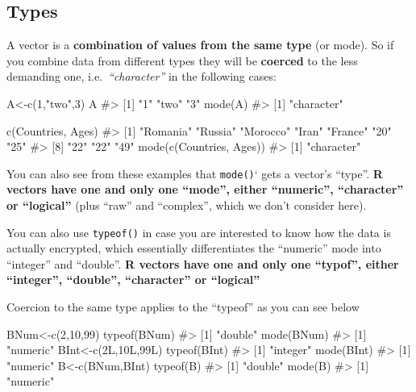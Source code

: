 \documentclass[
  letterpaper,
  DIV=11,
  numbers=noendperiod]{scrreprt}
\newenvironment{Shaded}{\begin{snugshade}}{\end{snugshade}}
\newcommand{\CommentTok}[1]{\textcolor[rgb]{0.37,0.37,0.37}{#1}}
\newcommand{\DecValTok}[1]{\textcolor[rgb]{0.68,0.00,0.00}{#1}}
\newcommand{\FunctionTok}[1]{\textcolor[rgb]{0.28,0.35,0.67}{#1}}
\newcommand{\NormalTok}[1]{\textcolor[rgb]{0.00,0.23,0.31}{#1}}
\newcommand{\OtherTok}[1]{\textcolor[rgb]{0.00,0.23,0.31}{#1}}
\newcommand{\StringTok}[1]{\textcolor[rgb]{0.13,0.47,0.30}{#1}}
\begin{document}
\subsection{Types}\label{types}

A vector is a \textbf{combination of values from the same type} (or
mode). So if you combine data from different types they will be
\textbf{coerced} to the less demanding one, i.e.~\emph{``character''} in
the following cases:

\begin{Shaded}
\begin{Highlighting}[]
\NormalTok{A}\OtherTok{\textless{}{-}}\FunctionTok{c}\NormalTok{(}\DecValTok{1}\NormalTok{,}\StringTok{"two"}\NormalTok{,}\DecValTok{3}\NormalTok{)}
\NormalTok{A}
\CommentTok{\#\textgreater{} [1] "1"   "two" "3"}
\FunctionTok{mode}\NormalTok{(A)}
\CommentTok{\#\textgreater{} [1] "character"}

\FunctionTok{c}\NormalTok{(Countries, Ages)}
\CommentTok{\#\textgreater{}  [1] "Romania" "Russia"  "Morocco" "Iran"    "France"  "20"      "25"     }
\CommentTok{\#\textgreater{}  [8] "22"      "22"      "49"}
\FunctionTok{mode}\NormalTok{(}\FunctionTok{c}\NormalTok{(Countries, Ages))}
\CommentTok{\#\textgreater{} [1] "character"}
\end{Highlighting}
\end{Shaded}

You can also see from these examples that \texttt{mode()}` gets a
vector's ``type''. \textbf{R vectors have one and only one ``mode'',
either ``numeric'', ``character'' or ``logical''} (plus ``raw'' and
``complex'', which we don't consider here).

You can also use \texttt{typeof()} in case you are interested to know
how the data is actually encrypted, which essentially differentiates the
``numeric'' mode into ``integer'' and ``double''. \textbf{R vectors have
one and only one ``typof'', either ``integer'', ``double'',
``character'' or ``logical''}

Coercion to the same type applies to the ``typeof'' as you can see below

\begin{Shaded}
\begin{Highlighting}[]
\NormalTok{BNum}\OtherTok{\textless{}{-}}\FunctionTok{c}\NormalTok{(}\DecValTok{2}\NormalTok{,}\DecValTok{10}\NormalTok{,}\DecValTok{99}\NormalTok{)}
\FunctionTok{typeof}\NormalTok{(BNum)}
\CommentTok{\#\textgreater{} [1] "double"}
\FunctionTok{mode}\NormalTok{(BNum)}
\CommentTok{\#\textgreater{} [1] "numeric"}
\NormalTok{BInt}\OtherTok{\textless{}{-}}\FunctionTok{c}\NormalTok{(}\DecValTok{2}\NormalTok{L,}\DecValTok{10}\NormalTok{L,}\DecValTok{99}\NormalTok{L)}
\FunctionTok{typeof}\NormalTok{(BInt)}
\CommentTok{\#\textgreater{} [1] "integer"}
\FunctionTok{mode}\NormalTok{(BInt)}
\CommentTok{\#\textgreater{} [1] "numeric"}
\NormalTok{B}\OtherTok{\textless{}{-}}\FunctionTok{c}\NormalTok{(BNum,BInt)}
\FunctionTok{typeof}\NormalTok{(B)}
\CommentTok{\#\textgreater{} [1] "double"}
\FunctionTok{mode}\NormalTok{(B)}
\CommentTok{\#\textgreater{} [1] "numeric"}
\end{Highlighting}
\end{Shaded}
\end{document}
